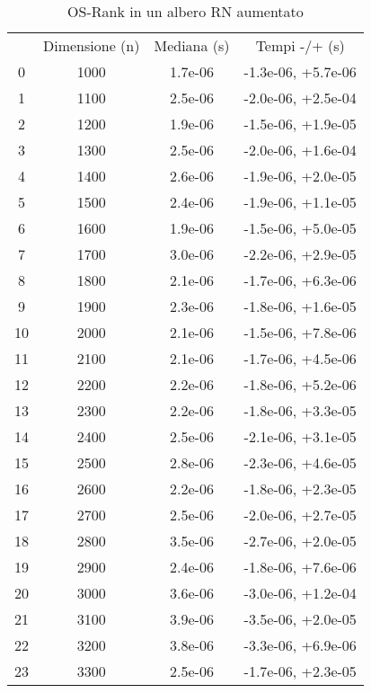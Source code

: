 \begin{table}
\centering
\caption{OS-Rank in un albero RN aumentato}
\label{OS-Rank in un albero RN aumentato}
\begin{adjustbox}{width=1\textwidth/2}
\begin{tabular}{|c|c|c|c|}
\hline
 & Dimensione (n) & Mediana (s) & Tempi -/+ (s) \\
0 & 1000 & 1.7e-06 & -1.3e-06, +5.7e-06 \\
\cline{1-4}
1 & 1100 & 2.5e-06 & -2.0e-06, +2.5e-04 \\
\cline{1-4}
2 & 1200 & 1.9e-06 & -1.5e-06, +1.9e-05 \\
\cline{1-4}
3 & 1300 & 2.5e-06 & -2.0e-06, +1.6e-04 \\
\cline{1-4}
4 & 1400 & 2.6e-06 & -1.9e-06, +2.0e-05 \\
\cline{1-4}
5 & 1500 & 2.4e-06 & -1.9e-06, +1.1e-05 \\
\cline{1-4}
6 & 1600 & 1.9e-06 & -1.5e-06, +5.0e-05 \\
\cline{1-4}
7 & 1700 & 3.0e-06 & -2.2e-06, +2.9e-05 \\
\cline{1-4}
8 & 1800 & 2.1e-06 & -1.7e-06, +6.3e-06 \\
\cline{1-4}
9 & 1900 & 2.3e-06 & -1.8e-06, +1.6e-05 \\
\cline{1-4}
10 & 2000 & 2.1e-06 & -1.5e-06, +7.8e-06 \\
\cline{1-4}
11 & 2100 & 2.1e-06 & -1.7e-06, +4.5e-06 \\
\cline{1-4}
12 & 2200 & 2.2e-06 & -1.8e-06, +5.2e-06 \\
\cline{1-4}
13 & 2300 & 2.2e-06 & -1.8e-06, +3.3e-05 \\
\cline{1-4}
14 & 2400 & 2.5e-06 & -2.1e-06, +3.1e-05 \\
\cline{1-4}
15 & 2500 & 2.8e-06 & -2.3e-06, +4.6e-05 \\
\cline{1-4}
16 & 2600 & 2.2e-06 & -1.8e-06, +2.3e-05 \\
\cline{1-4}
17 & 2700 & 2.5e-06 & -2.0e-06, +2.7e-05 \\
\cline{1-4}
18 & 2800 & 3.5e-06 & -2.7e-06, +2.0e-05 \\
\cline{1-4}
19 & 2900 & 2.4e-06 & -1.8e-06, +7.6e-06 \\
\cline{1-4}
20 & 3000 & 3.6e-06 & -3.0e-06, +1.2e-04 \\
\cline{1-4}
21 & 3100 & 3.9e-06 & -3.5e-06, +2.0e-05 \\
\cline{1-4}
22 & 3200 & 3.8e-06 & -3.3e-06, +6.9e-06 \\
\cline{1-4}
23 & 3300 & 2.5e-06 & -1.7e-06, +2.3e-05 \\

\end{tabular}
\end{adjustbox}
\end{table}
